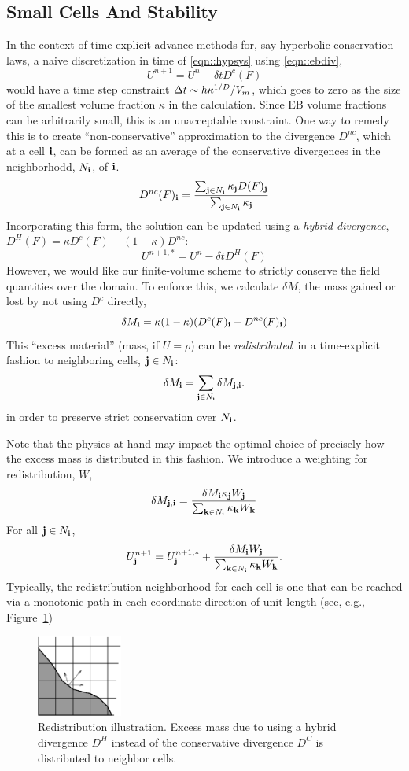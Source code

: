 \subsection{Small Cells And Stability}

In the context of time-explicit advance methods for, say hyperbolic conservation laws, 
a naive discretization in time of \ref{eqn::hypsys} using \ref{eqn::ebdiv},
$$
U^{n+1} = U^{n} - \delta t D^c(F)
$$
would have a time step constraint $\Delta t \sim h \kappa^{1/D}/V_m$,  which
goes to zero as the size of the 
smallest volume fraction $\kappa$ in the calculation.  Since EB volume fractions can
be arbitrarily small, this is an unacceptable constraint.  One way to remedy
this is to create ``non-conservative'' approximation to the divergence
$D^{nc}$, which at a cell ${\bf i}$, can be formed as an average of the conservative
divergences in the neighborhodd, $N_{\bf i}$, of ${\bf i}$.
$$
D^{nc}(F)_{\bf i} = \frac{\sum_{{\bf j} \in N_{\bf i}}\kappa_{\bf j} D(F)_{\bf j}}{\sum_{{\bf j} \in N_{\bf i}}\kappa_{\bf j}}
$$
Incorporating this form, the solution can be updated using a {\it hybrid divergence},
$D^H(F) = \kappa D^c(F) + (1-\kappa)D^{nc}$:
$$
U^{n+1,*} = U^n - \delta t D^H(F)
$$
However, we would like our finite-volume scheme to strictly conserve the field quantities
over the domain.  To enforce this, we calculate $\delta M$, the mass gained or
lost by not using $D^c$ directly,
$$
\delta M_{\bf i} = \kappa (1-\kappa)(D^c(F)_{\bf i} - D^{nc}(F)_{\bf i})
$$
This ``excess material'' (mass, if $U=\rho$) can be {\em redistributed}\ in a time-explicit fashion
to neighboring cells, ${\bf j} \in N_{\bf i}$:
$$
\delta M_{\bf i} = \sum_{{\bf j} \in N_{\bf i}} \delta M_{{\bf j}, {\bf i}}.
$$
in order to preserve strict conservation over $N_{\bf i}$.

Note that the physics at hand may impact the optimal choice of precisely how the excess mass is distributed
in this fashion.  We introduce a weighting for redistribution, $W$,
\begin{equation}
\delta M_{{\bf j}, {\bf i}} =  \frac{\delta M_{\bf i} \kappa_{\bf j}
  W_{\bf j}}{\sum_{{\bf k} \in N_{\bf i}} \kappa_{\bf k} W_{\bf k}}
\label{eqn::massweight}
\end{equation}
For all ${\bf j} \in N_{\bf i}$,
$$
U^{n+1}_{\bf j} = U^{n+1,*}_{\bf j} + 
 \frac{\delta M_{\bf i}
  W_{\bf j}}{\sum_{{\bf k} \in N_{\bf i}} \kappa_{\bf k} W_{\bf k}}.
$$
 Typically, the redistribution neighborhood for each cell is one that can be reached via a monotonic
 path in each coordinate direction of unit length
(see, e.g., Figure~\ref{fig::redistribution})
\begin{figure}[h]
  \centering
  \includegraphics[width=0.25\textwidth]{./EB/redist.pdf}
\caption{\label{fig::redistribution}
Redistribution illustration.  Excess mass due to using a hybrid
divergence $D^H$ instead of the conservative divergence $D^C$ is
distributed to neighbor cells.}
\end{figure}

